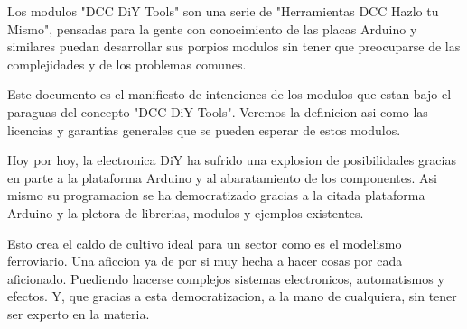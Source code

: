 
Los modulos "DCC DiY Tools" son una serie de "Herramientas DCC Hazlo tu Mismo", pensadas para la gente con conocimiento de las placas Arduino y similares
puedan desarrollar sus porpios modulos sin tener que preocuparse de las complejidades y de los problemas comunes.

Este documento es el manifiesto de intenciones de los modulos que estan bajo el paraguas del concepto "DCC DiY Tools". Veremos la definicion asi como las licencias y garantias generales que se pueden esperar de estos modulos.  

Hoy por hoy, la electronica DiY ha sufrido una explosion de posibilidades gracias en parte a la plataforma Arduino y al abaratamiento de los componentes.
Asi mismo su programacion se ha democratizado gracias a la citada plataforma Arduino y la pletora de librerias, modulos y ejemplos existentes. 

Esto crea el caldo de cultivo ideal para un sector como es el modelismo ferroviario. Una aficcion ya de por si muy hecha a hacer cosas por cada aficionado. Puediendo hacerse complejos sistemas electronicos, automatismos y efectos. Y, que gracias a esta democratizacion, a la mano de cualquiera, sin tener ser experto en la materia.